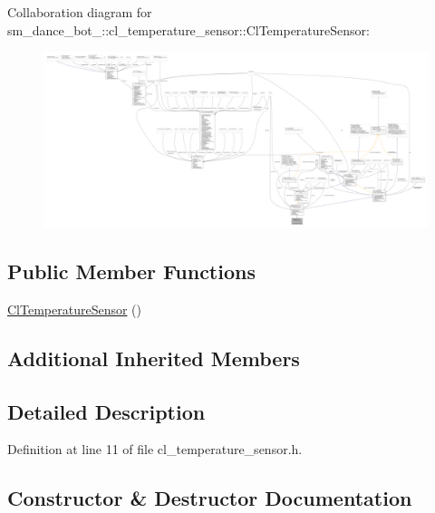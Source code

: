 Collaboration diagram for sm\+\_\+dance\+\_\+bot\+\_\+:\+:cl\+\_\+temperature\+\_\+sensor\+:\+:Cl\+Temperature\+Sensor\+:
\nopagebreak
\begin{figure}[H]
\begin{center}
\leavevmode
\includegraphics[width=350pt]{classsm__dance__bot__3_1_1cl__temperature__sensor_1_1ClTemperatureSensor__coll__graph}
\end{center}
\end{figure}
\subsection*{Public Member Functions}
\begin{DoxyCompactItemize}
\item 
\hyperlink{classsm__dance__bot__3_1_1cl__temperature__sensor_1_1ClTemperatureSensor_a2ce4a897be62eb09c6089a4f4babbe35}{Cl\+Temperature\+Sensor} ()
\end{DoxyCompactItemize}
\subsection*{Additional Inherited Members}


\subsection{Detailed Description}


Definition at line 11 of file cl\+\_\+temperature\+\_\+sensor.\+h.



\subsection{Constructor \& Destructor Documentation}
